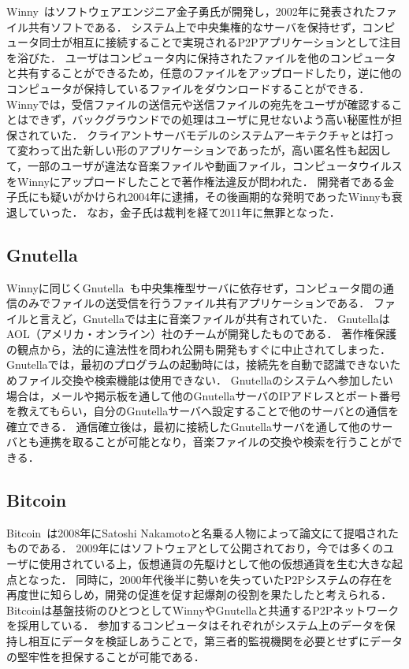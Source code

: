 Winny~\cite{Winny}はソフトウェアエンジニア金子勇氏が開発し，2002年に発表されたファイル共有ソフトである．
システム上で中央集権的なサーバを保持せず，コンピュータ同士が相互に接続することで実現されるP2Pアプリケーションとして注目を浴びた．
ユーザはコンピュータ内に保持されたファイルを他のコンピュータと共有することができるため，任意のファイルをアップロードしたり，逆に他のコンピュータが保持しているファイルをダウンロードすることができる．
Winnyでは，受信ファイルの送信元や送信ファイルの宛先をユーザが確認することはできず，バックグラウンドでの処理はユーザに見せないよう高い秘匿性が担保されていた．
クライアントサーバモデルのシステムアーキテクチャとは打って変わって出た新しい形のアプリケーションであったが，高い匿名性も起因して，一部のユーザが違法な音楽ファイルや動画ファイル，コンピュータウイルスをWinnyにアップロードしたことで著作権法違反が問われた．
開発者である金子氏にも疑いがかけられ2004年に逮捕，その後画期的な発明であったWinnyも衰退していった．
なお，金子氏は裁判を経て2011年に無罪となった．

\subsection{Gnutella}

Winnyに同じくGnutella~\cite{Gnutella}も中央集権型サーバに依存せず，コンピュータ間の通信のみでファイルの送受信を行うファイル共有アプリケーションである．
ファイルと言えど，Gnutellaでは主に音楽ファイルが共有されていた．
GnutellaはAOL（アメリカ・オンライン）社のチームが開発したものである．
著作権保護の観点から，法的に違法性を問われ公開も開発もすぐに中止されてしまった．
Gnutellaでは，最初のプログラムの起動時には，接続先を自動で認識できないためファイル交換や検索機能は使用できない．
Gnutellaのシステムへ参加したい場合は，メールや掲示板を通して他のGnutellaサーバのIPアドレスとポート番号を教えてもらい，自分のGnutellaサーバへ設定することで他のサーバとの通信を確立できる．
通信確立後は，最初に接続したGnutellaサーバを通して他のサーバとも連携を取ることが可能となり，音楽ファイルの交換や検索を行うことができる．

\subsection{Bitcoin}

Bitcoin~\cite{Bitcoin}は2008年にSatoshi Nakamotoと名乗る人物によって論文にて提唱されたものである．
2009年にはソフトウェアとして公開されており，今では多くのユーザに使用されている上，仮想通貨の先駆けとして他の仮想通貨を生む大きな起点となった．
同時に，2000年代後半に勢いを失っていたP2Pシステムの存在を再度世に知らしめ，開発の促進を促す起爆剤の役割を果たしたと考えられる．
Bitcoinは基盤技術のひとつとしてWinnyやGnutellaと共通するP2Pネットワークを採用している．
参加するコンピュータはそれぞれがシステム上のデータを保持し相互にデータを検証しあうことで，第三者的監視機関を必要とせずにデータの堅牢性を担保することが可能である．

